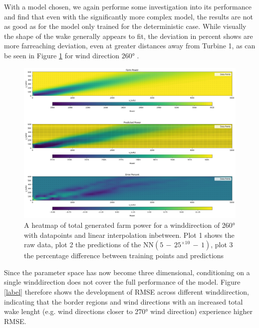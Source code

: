With a model chosen, we again performe some investigation into its performance and find that even with the significantly more complex model, the results are not as good as for the model only trained for the deterministic case. While visually the shape of the wake generally appears to fit, the deviation in percent shows are more farreaching deviation, even at greater distances away from Turbine 1, as can be seen in Figure \ref{fig:prob_model_colormap} for wind direction 260° . 

\begin{figure}[h] 
	\centering
	\includegraphics[width=1\textwidth]{figures/optimization/prob_model_colormap.png} 
	\caption{A heatmap of total generated farm power for a winddirection of 260° with datapoints and linear interpolation inbetween. Plot 1 shows the raw data, plot 2 the predictions of the $\text{NN}(5\,{-}\,25^{\times10}\,{-}\,1)$, plot 3 the percentage difference between training points and predictions }
	\label{fig:prob_model_colormap}
\end{figure}

Since the parameter space has now become three dimensional, conditioning on a single winddirection does not cover the full performance of the model. Figure \ref{label} therefore shows the development of RMSE across different winddirection, indicating that the border regions and wind directions with an increased total wake lenght (e.g. wind directions closer to 270° wind direction) experience higher RMSE. 

